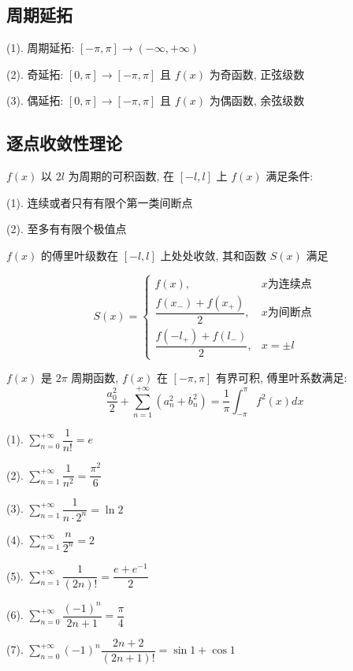 \subsection{周期延拓}
\begin{definition}[周期延拓]
	(1). 周期延拓: $[-\pi,\pi] \to (-\infty,+\infty)$

	(2). 奇延拓: $[0,\pi] \to [-\pi,\pi]$ 且 $f(x)$ 为奇函数, 正弦级数

	(3). 偶延拓: $[0,\pi] \to [-\pi,\pi]$ 且 $f(x)$ 为偶函数, 余弦级数
\end{definition}

\subsection{逐点收敛性理论}
\begin{theorem}[狄利克雷收敛定理]
$f(x)$ 以 $2l$ 为周期的可积函数, 在 $[-l,l]$ 上 $f(x)$ 满足条件:

(1). 连续或者只有有限个第一类间断点

(2). 至多有有限个极值点

$f(x)$ 的傅里叶级数在 $[-l,l]$ 上处处收敛, 其和函数 $S(x)$ 满足 

$$S(x) = \begin{cases}
			f(x),                          & x\text{为连续点}\\
			\dfrac{f(x_{-})+f(x_{+})}{2},  & x \text{为间断点}\\
			\dfrac{f(-l_{+})+f(l_{-})}{2}, & x = \pm l  
		\end{cases}$$
\end{theorem}
\begin{theorem}[帕塞瓦尔公式]
	$f(x)$ 是 $2\pi$ 周期函数, $f(x)$ 在 $[-\pi,\pi]$ 有界可积, 傅里叶系数满足:
	$$\dfrac{a_{0}^{2}}{2} + \sum\limits_{n=1}^{+\infty}(a_{n}^{2}+b_{n}^{2}) = \dfrac{1}{\pi}\int_{-\pi}^{\pi}f^{2}(x)dx$$
\end{theorem}

\begin{corollary}[常见级数和]
(1). $\sum\limits_{n=0}^{+\infty}\dfrac{1}{n!} = e$

(2). $\sum\limits_{n=1}^{+\infty}\dfrac{1}{n^{2}} = \dfrac{\pi^{2}}{6}$

(3). $\sum\limits_{n=1}^{+\infty}\dfrac{1}{n\cdot 2^{n}} = \ln 2$

(4). $\sum\limits_{n=1}^{+\infty}\dfrac{n}{2^{n}} = 2$

(5). $\sum\limits_{n=1}^{+\infty}\dfrac{1}{(2n)!} = \dfrac{e+e^{-1}}{2}$

(6). $\sum\limits_{n=0}^{+\infty}\dfrac{(-1)^{n}}{2n+1} = \dfrac{\pi}{4}$

(7). $\sum\limits_{n=0}^{+\infty}(-1)^{n}\dfrac{2n+2}{(2n+1)!} = \sin 1 + \cos 1$
\end{corollary}

